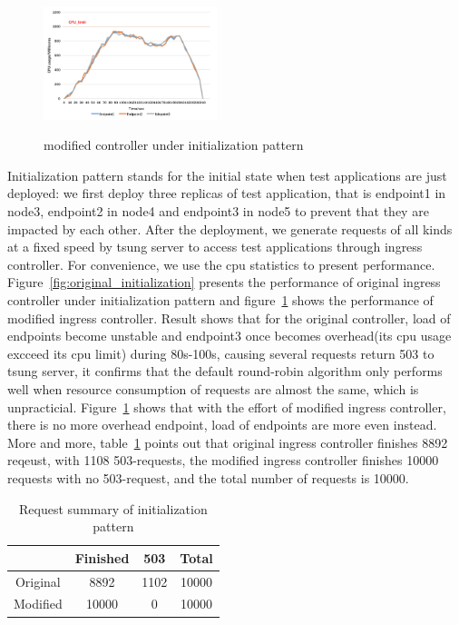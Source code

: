 \begin{figure}[!htb]
 \centering
 \includegraphics[width=0.45\textwidth]{images/data2.png}\\
 \caption{modified controller under initialization pattern}
 \label{fig:modified_initialization}
\end{figure}

Initialization pattern stands for the initial state when test applications are just deployed: we first deploy three replicas of test application, that is endpoint1 in node3, endpoint2 in node4 and endpoint3 in node5
to prevent that they are impacted by each other. After the deployment, we generate requests of all kinds at a fixed speed by tsung server to access test applications through ingress controller.
For convenience, we use the cpu statistics to present performance. Figure~\ref{fig:original_initialization} presents the performance of original ingress controller under initialization pattern and
figure~{\ref{fig:modified_initialization}} shows the performance of modified ingress controller. Result shows that for the original controller, load of endpoints become unstable and endpoint3 once becomes overhead(its cpu usage excceed its cpu limit) during 80s-100s, causing several
requests return 503 to tsung server, it confirms that the default round-robin algorithm only performs well when resource consumption of requests are almost the same, which is unpracticial. Figure~{\ref{fig:modified_initialization}} shows that
with the effort of modified ingress controller, there is no more overhead endpoint, load of endpoints are more even instead. More and more, table~{\ref{table:request_summary1}} points out that original ingress controller finishes 8892 reqeust, with 1108 503-requests, the
modified ingress controller finishes 10000 requests with no 503-request, and the total number of requests is 10000.
\hspace{0pt}
\begin{table}[htbp]
 \begin{center}
  \begin{tabular}{c|c|c|c}
   \hline
            & Finished & 503  & Total \\  \hline
   Original & 8892     & 1102 & 10000 \\ \hline
   Modified & 10000    & 0    & 10000 \\ \hline
  \end{tabular}
 \end{center}
 \caption{Request summary of initialization pattern}
 \label{table:request_summary1}
\end{table}


